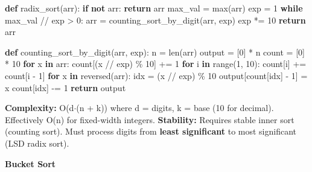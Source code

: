 \documentclass[11pt]{article}
\newenvironment{Shaded}{\begin{snugshade}}{\end{snugshade}}
\newcommand{\BuiltInTok}[1]{\textcolor[rgb]{0.50,0.55,0.55}{#1}}
\newcommand{\ControlFlowTok}[1]{\textcolor[rgb]{0.99,0.74,0.29}{\textbf{#1}}}
\newcommand{\DecValTok}[1]{\textcolor[rgb]{0.96,0.45,0.00}{#1}}
\newcommand{\KeywordTok}[1]{\textcolor[rgb]{0.81,0.81,0.76}{\textbf{#1}}}
\newcommand{\NormalTok}[1]{\textcolor[rgb]{0.81,0.81,0.76}{#1}}
\newcommand{\OperatorTok}[1]{\textcolor[rgb]{0.81,0.81,0.76}{#1}}
\begin{document}
\begin{Shaded}
\begin{Highlighting}[]
\KeywordTok{def}\NormalTok{ radix\_sort(arr):}
    \ControlFlowTok{if} \KeywordTok{not}\NormalTok{ arr: }\ControlFlowTok{return}\NormalTok{ arr}
\NormalTok{    max\_val }\OperatorTok{=} \BuiltInTok{max}\NormalTok{(arr)}
\NormalTok{    exp }\OperatorTok{=} \DecValTok{1}
    \ControlFlowTok{while}\NormalTok{ max\_val }\OperatorTok{//}\NormalTok{ exp }\OperatorTok{\textgreater{}} \DecValTok{0}\NormalTok{:}
\NormalTok{        arr }\OperatorTok{=}\NormalTok{ counting\_sort\_by\_digit(arr, exp)}
\NormalTok{        exp }\OperatorTok{*=} \DecValTok{10}
    \ControlFlowTok{return}\NormalTok{ arr}

\KeywordTok{def}\NormalTok{ counting\_sort\_by\_digit(arr, exp):}
\NormalTok{    n }\OperatorTok{=} \BuiltInTok{len}\NormalTok{(arr)}
\NormalTok{    output }\OperatorTok{=}\NormalTok{ [}\DecValTok{0}\NormalTok{] }\OperatorTok{*}\NormalTok{ n}
\NormalTok{    count }\OperatorTok{=}\NormalTok{ [}\DecValTok{0}\NormalTok{] }\OperatorTok{*} \DecValTok{10}
    \ControlFlowTok{for}\NormalTok{ x }\KeywordTok{in}\NormalTok{ arr:}
\NormalTok{        count[(x }\OperatorTok{//}\NormalTok{ exp) }\OperatorTok{\%} \DecValTok{10}\NormalTok{] }\OperatorTok{+=} \DecValTok{1}
    \ControlFlowTok{for}\NormalTok{ i }\KeywordTok{in} \BuiltInTok{range}\NormalTok{(}\DecValTok{1}\NormalTok{, }\DecValTok{10}\NormalTok{):}
\NormalTok{        count[i] }\OperatorTok{+=}\NormalTok{ count[i }\OperatorTok{{-}} \DecValTok{1}\NormalTok{]}
    \ControlFlowTok{for}\NormalTok{ x }\KeywordTok{in} \BuiltInTok{reversed}\NormalTok{(arr):}
\NormalTok{        idx }\OperatorTok{=}\NormalTok{ (x }\OperatorTok{//}\NormalTok{ exp) }\OperatorTok{\%} \DecValTok{10}
\NormalTok{        output[count[idx] }\OperatorTok{{-}} \DecValTok{1}\NormalTok{] }\OperatorTok{=}\NormalTok{ x}
\NormalTok{        count[idx] }\OperatorTok{{-}=} \DecValTok{1}
    \ControlFlowTok{return}\NormalTok{ output}
\end{Highlighting}
\end{Shaded}

\textbf{Complexity:} O(d\(\cdot\)(n + k)) where d = digits, k = base (10 for decimal). Effectively O(n) for fixed-width integers.
\textbf{Stability:} Requires stable inner sort (counting sort). Must process digits from \textbf{least significant} to most significant (LSD radix sort).

\textbf{Bucket Sort}

\end{document}
